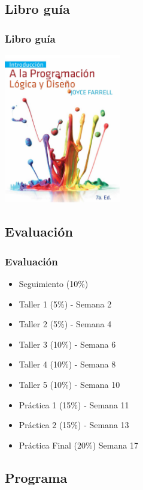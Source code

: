 \documentclass[xcolor=svgnames]{beamer}
\theoremstyle{example}
\begin{document}
\subsection{Libro guía}

\begin{frame}
  \frametitle{Libro guía}
  \begin{center}
      \includegraphics[width=0.38\textwidth]{../aux/farrell}\vspace{-.2cm}  \cite{farrell}
  \end{center}
  
\end{frame}

\subsection{Evaluación}

\begin{frame}
  \frametitle{Evaluación}
  \begin{itemize}%
  \item Seguimiento (10\%) 
  \item Taller 1 (5\%) - Semana 2  
  \item Taller 2 (5\%) - Semana 4  
  \item Taller 3 (10\%) - Semana 6 
  \item Taller 4 (10\%) - Semana 8 
  \item Taller 5 (10\%) - Semana 10
  \item Práctica 1 (15\%) - Semana 11
  \item Práctica 2 (15\%) - Semana 13
  \item Práctica Final (20\%) Semana 17
  \end{itemize}
\end{frame}

\subsection{Programa}
\end{document}
